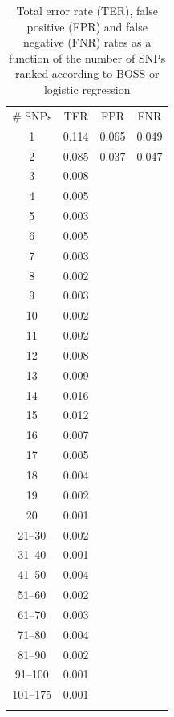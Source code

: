 \begin{table}
\caption{Total error rate (TER), false positive (FPR) and false negative
  (FNR) rates as a function of the number of SNPs ranked according to
  BOSS or logistic regression}
\label{tab:error}       %
\begin{tabular}{cccc}
\hline\noalign{\smallskip}
\# SNPs & TER & FPR & FNR \\
\noalign{\smallskip}\hline\noalign{\smallskip}
1 & 0.114 & 0.065 & 0.049 \\
2 & 0.085 & 0.037 & 0.047 \\
3 & 0.008 &  &  \\
4 & 0.005 &  &  \\
5 & 0.003 &  &  \\
6 & 0.005 &  &  \\
7 & 0.003 &  &  \\
8 & 0.002 &  &  \\
9 & 0.003 &  &  \\
10 & 0.002 &  &  \\
11 & 0.002 &  &  \\
12 & 0.008 &  &  \\
13 & 0.009 &  &  \\
14 & 0.016 &  &  \\
15 & 0.012 &  &  \\
16 & 0.007 &  &  \\
17 & 0.005 &  &  \\
18 & 0.004 &  &  \\
19 & 0.002 &  &  \\
20 & 0.001 &  &  \\
21--30 & 0.002  &  &  \\
31--40 & 0.001 &  &  \\
41--50 & 0.004 &  &  \\
51--60 & 0.002 &  &  \\
61--70 & 0.003 &  &  \\
71--80 & 0.004 &  &  \\
81--90 & 0.002 &  &  \\
91--100 & 0.001 &  &  \\
101--175 & 0.001 &  &  \\
\noalign{\smallskip}\hline
\end{tabular}
\end{table}



